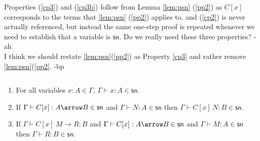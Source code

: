 \documentclass{article}
\newcommand{\csn}{\mathsf{sn}}
\newcommand{\red}{\longrightarrow}
\newcommand{\redsn}{\longrightarrow_\csn}
\begin{document}
\begin{metanote}
	Properties (\ref{cp3}) and (\ref{cp3b}) follow from Lemma
        \ref{lem:psn} (\ref{pp2}) as $C[x]$ corresponds to the terms
        that \ref{lem:psn} (\ref{pp2}) applies to, and (\ref{cp2}) is
        never actually referenced, but instead the same one-step proof
        is repeated whenever we need to establish that a variable is
        $\csn$. Do we really need these three properties? -ah
\\[0.5em]
I think we should restate \ref{lem:psn}(\ref{pp2}) as Property
\ref{cp3} and rather remove \ref{lem:psn}(\ref{pp2}. -bp
\end{metanote}


\begin{lemma}\label{lm:closn}$\;$
  \begin{enumerate}
  \item\label{cp2} For all variables $x:A \in \Gamma$, $\Gamma \vdash x : A \in \csn$.
  \item\label{cp3} If $\Gamma \vdash C[x] : A \arrow B \in \csn$ and $\Gamma \vdash N : A \in \csn$
     then $\Gamma \vdash C[x]\,N : B \in \csn$.
  \item\label{cp3b} If $\Gamma \vdash C[x]~M \red R : B$ and $\Gamma \vdash C[x] : A \arrow B \in
\csn$ and $\Gamma \vdash M : A \in \csn$ then $\Gamma \vdash R : B\in \csn$.
\end{enumerate}
\end{lemma}
\end{document}

